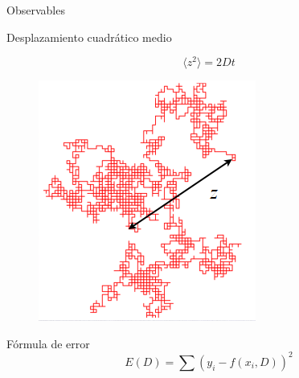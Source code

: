 \begin{frame}{Observables}
    \begin{block}{Desplazamiento cuadrático medio}
        \begin{minipage}[t]{0.7\linewidth}
            \begin{equation*}
                \langle z^2 \rangle = 2 D t
            \end{equation*}
        \end{minipage}%
        \hfill%
        \begin{minipage}[t]{0.2\linewidth}
            \begin{figure}[H]
                \centering
                \includegraphics[width=0.5\linewidth]{pic/04-sim/dcm}\label{fig:figure-dcm}
            \end{figure}
        \end{minipage}
    \end{block}

    \begin{block}{Fórmula de error}
        \begin{equation*}
            E(D) = \sum (y_i - f(x_i, D))^2
        \end{equation*}
    \end{block}
\end{frame}






